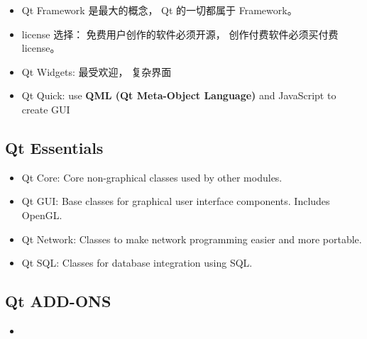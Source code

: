 
\begin{issues}
\issueDraft
\end{issues}

\begin{itemize}
\item Qt Framework 是最大的概念， Qt 的一切都属于 Framework。
\item license 选择： 免费用户创作的软件必须开源， 创作付费软件必须买付费 license。
\item Qt Widgets: 最受欢迎， 复杂界面
\item Qt Quick: use \textbf{QML (Qt Meta-Object Language)} and JavaScript to create GUI
\end{itemize}


\subsection{Qt Essentials}
\begin{itemize}
\item Qt Core: Core non-graphical classes used by other modules.
\item Qt GUI: Base classes for graphical user interface components. Includes OpenGL.
\item Qt Network: Classes to make network programming easier and more portable.
\item Qt SQL: Classes for database integration using SQL.
\end{itemize}

\subsection{Qt ADD-ONS}
\begin{itemize}
\item 
\end{itemize}
